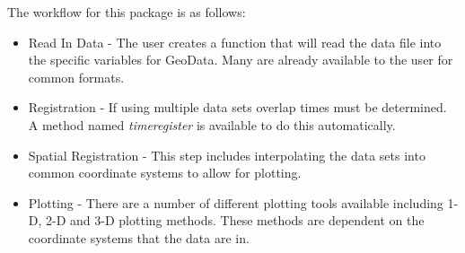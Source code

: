 The workflow for this package is as follows:
\begin{itemize}
\item Read In Data - The user creates a function that will read the data file into the specific variables for GeoData. Many are already available to the user for common formats.
\item Registration - If using multiple data sets overlap times must be determined. A method named \textit{timeregister} is available to do this automatically.
\item Spatial Registration - This step includes interpolating the data sets into common coordinate systems to allow for plotting.
\item Plotting - There are a number of different plotting tools available including 1-D, 2-D and 3-D plotting methods. These methods are dependent on the coordinate systems that the data are in.
\end{itemize}
